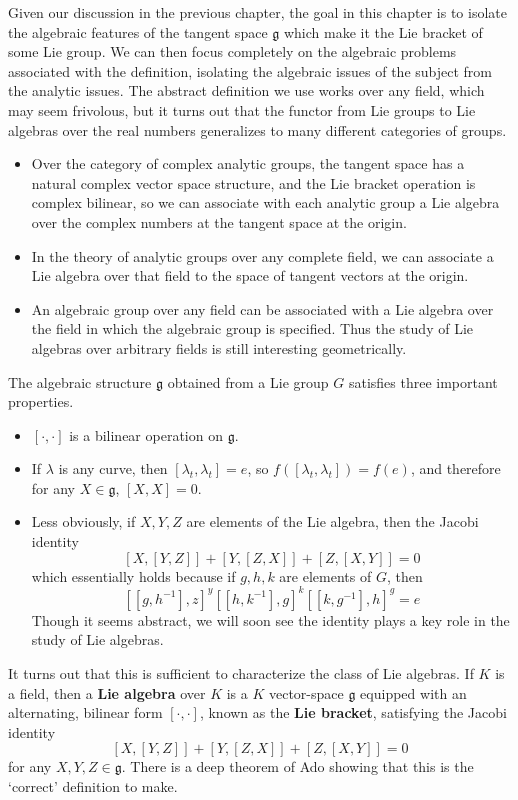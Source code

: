 Given our discussion in the previous chapter, the goal in this chapter is to isolate the algebraic features of the tangent space $\mathfrak{g}$ which make it the Lie bracket of some Lie group. We can then focus completely on the algebraic problems associated with the definition, isolating the algebraic issues of the subject from the analytic issues. The abstract definition we use works over any field, which may seem frivolous, but it turns out that the functor from Lie groups to Lie algebras over the real numbers generalizes to many different categories of groups.
%
\begin{itemize}
    \item Over the category of complex analytic groups, the tangent space has a natural complex vector space structure, and the Lie bracket operation is complex bilinear, so we can associate with each analytic group a Lie algebra over the complex numbers at the tangent space at the origin.

    \item In the theory of analytic groups over any complete field, we can associate a Lie algebra over that field to the space of tangent vectors at the origin.

    \item An algebraic group over any field can be associated with a Lie algebra over the field in which the algebraic group is specified. Thus the study of Lie algebras over arbitrary fields is still interesting geometrically.
\end{itemize}
%
The algebraic structure $\mathfrak{g}$ obtained from a Lie group $G$ satisfies three important properties.
%
\begin{itemize}
    \item $[\cdot, \cdot]$ is a bilinear operation on $\mathfrak{g}$.
    \item If $\lambda$ is any curve, then $[\lambda_t, \lambda_t] = e$, so $f([\lambda_t, \lambda_t]) = f(e)$, and therefore for any $X \in \mathfrak{g}$, $[X,X] = 0$.
    \item Less obviously, if $X,Y,Z$ are elements of the Lie algebra, then the Jacobi identity
    \[ [X,[Y,Z]] + [Y,[Z,X]] + [Z,[X,Y]] = 0 \]
    which essentially holds because if $g,h,k$ are elements of $G$, then
    \[ [[g,h^{-1}],z]^y [[h,k^{-1}],g]^k [[k,g^{-1}], h]^g = e \]
    Though it seems abstract, we will soon see the identity plays a key role in the study of Lie algebras.
\end{itemize}
%
It turns out that this is sufficient to characterize the class of Lie algebras. If $K$ is a field, then a {\bf Lie algebra} over $K$ is a $K$ vector-space $\mathfrak{g}$ equipped with an alternating, bilinear form $[\cdot, \cdot]$, known as the {\bf Lie bracket}, satisfying the Jacobi identity
%
\[ [X,[Y,Z]] + [Y,[Z,X]] + [Z,[X,Y]] = 0 \]
%
for any $X,Y,Z \in \mathfrak{g}$. There is a deep theorem of Ado showing that this is the `correct' definition to make.

